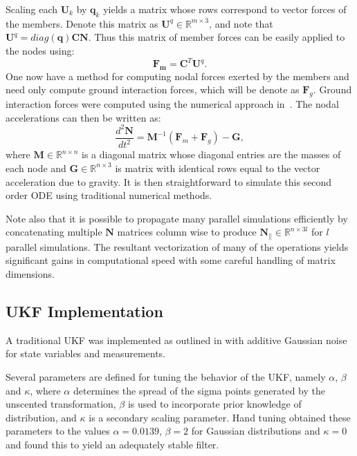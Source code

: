 {Scaling each $\boldsymbol{U}_k$ by $\boldsymbol{q}_k$ yields a matrix whose rows correspond to vector forces of the members. 
Denote this matrix as $\boldsymbol{U}^q\in\mathbb{R}^{m\times 3}$, and note that $\boldsymbol{U}^q = diag(\boldsymbol{q}) \boldsymbol{C} \boldsymbol{N}$.
Thus this matrix of member forces can be easily applied to the nodes using:
$$
\boldsymbol{F_m} = \boldsymbol{C}^{T} \boldsymbol{U}^q.
$$
One now have a method for computing nodal forces exerted by the members and need only compute ground interaction forces, which will be denote as $\boldsymbol{F}_g$.
Ground interaction forces were computed using the numerical approach in~\cite{yamane2006stable}. The nodal accelerations can then be written as:
$$
\frac{d^2\boldsymbol{N}}{dt^2} = \boldsymbol{M}^{-1}(\boldsymbol{F}_m+ \boldsymbol{F}_g) -  \boldsymbol{G},
$$
where $\boldsymbol{M}\in\mathbb{R}^{n\times n}$ is a diagonal matrix whose diagonal entries are the masses of each node and $\boldsymbol{G}\in\mathbb{R}^{n\times 3}$ is matrix with identical rows equal to the vector acceleration due to gravity. 
It is then straightforward to simulate this second order ODE using traditional numerical methods. 

Note also that it is possible to propagate many parallel simulations efficiently by concatenating multiple $\boldsymbol{N}$ matrices column wise to produce  $\boldsymbol{N}_{\parallel}\in\mathbb{R}^{n\times 3l}$ for $l$ parallel simulations.
The resultant vectorization of many of the operations yields significant gains in computational speed with some careful handling of matrix dimensions.   

\subsection{UKF Implementation}

A traditional UKF was implemented as outlined in \cite{wan2000unscented} with additive Gaussian noise for state variables and measurements.

Several parameters are defined for tuning the behavior of the UKF, namely $\alpha$, $\beta$ and $\kappa$, where $\alpha$ determines the spread of the sigma points generated by the unscented transformation, $\beta$ is used to incorporate prior knowledge of distribution, and $\kappa$ is a secondary scaling parameter.
Hand tuning obtained these parameters to the values $\alpha = 0.0139$, $\beta = 2$ for Gaussian distributions and $\kappa = 0$ and found this to yield an adequately stable filter.

}
